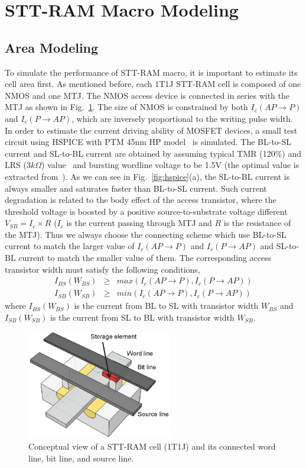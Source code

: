\section{STT-RAM Macro Modeling} \label{sec:model}

\subsection{Area Modeling}
To simulate the performance of STT-RAM macro, it is important to estimate its cell area first. As mentioned before, each 1T1J STT-RAM cell is composed of one NMOS and one MTJ. The NMOS access device is connected in series with the MTJ as shown in Fig.~\ref{fig:1t1r}. The size of NMOS is constrained by both $I_{c}(AP\rightarrow P)$ and $I_{c}(P\rightarrow AP)$, which are inversely proportional to the writing pulse width. In order to estimate the current driving ability of MOSFET devices, a small test circuit using HSPICE with PTM 45nm HP model~\cite{PTM} is simulated. The BL-to-SL current and SL-to-BL current are obtained by assuming typical TMR (120\%) and LRS ($3k\Omega$) value~\cite{STTRAM:Qualcomm09} and bursting wordline voltage to be 1.5V (the optimal value is extracted from~\cite{STTRAM:Gatech10}). As we can see in Fig.~\ref{fig:hspice}(a), the SL-to-BL current is always smaller and saturates faster than BL-to-SL current. Such current degradation is related to the body effect of the access transistor, where the threshold voltage is boosted by a positive source-to-substrate voltage different $V_{SB}=I_{c}\times R$ ($I_{c}$ is the current passing through MTJ and $R$ is the resistance of the MTJ). Thus we always choose the connecting scheme which use BL-to-SL current to match the larger value of $I_{c}(AP\rightarrow P)$ and $I_{c}(P\rightarrow AP)$ and SL-to-BL current to match the smaller value of them. The corresponding access transistor width must satisfy the following conditions,
\begin{eqnarray}
I_{BS}(W_{BS}) &\geq& max(I_{c}(AP\rightarrow P), I_{c}(P\rightarrow AP)) \\
I_{SB}(W_{SB}) &\geq& min(I_{c}(AP\rightarrow P), I_{c}(P\rightarrow AP))
\end{eqnarray}
where $I_{BS}(W_{BS})$ is the current from BL to SL with transistor width $W_{BS}$ and $I_{SB}(W_{SB})$ is the current from SL to BL with transistor width $W_{SB}$.

\begin{figure}[t]
  \centering
  \includegraphics[width=2.5in]{fig/1t1r.eps}
  \vspace{-10pt}
  \caption{Conceptual view of a STT-RAM cell (1T1J) and its connected word line, bit line, and source line.}
  \label{fig:1t1r}
  \vspace{-5pt}
\end{figure}

